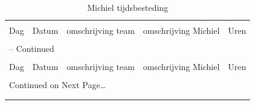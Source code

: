 \documentclass[12pt,a4paper]{report}
\begin{document}
\begin{landscape}
\begin{longtable}{llp{7cm}p{10cm}l}
\caption{Michiel tijdsbesteding} \\

\hline \hline \\[-2ex]
  \multicolumn{1}{l}{Dag} & \multicolumn{1}{l}{Datum} &
  \multicolumn{1}{p{7cm}}{omschrijving team} &
  \multicolumn{1}{p{10cm}}{omschrijving Michiel} &
  \multicolumn{1}{l}{Uren}  \\[0.5ex] \hline \\[-1.8ex]
\endfirsthead

\multicolumn{5}{l}{{\tablename} \thetable{} -- Continued} \\[0.5ex]
\hline \hline \\[-2ex]
  \multicolumn{1}{l}{Dag} & \multicolumn{1}{l}{Datum} &
  \multicolumn{1}{p{7cm}}{omschrijving team} &
  \multicolumn{1}{p{10cm}}{omschrijving Michiel} &
  \multicolumn{1}{l}{Uren}  \\[0.5ex] \hline \\[-1.8ex]
\endhead

\multicolumn{5}{l}{{Continued on Next Page\ldots}} \\
\endfoot

\\[-1.8ex] \hline \hline
\endlastfoot


\end{longtable}
\end{landscape}
\end{document}
